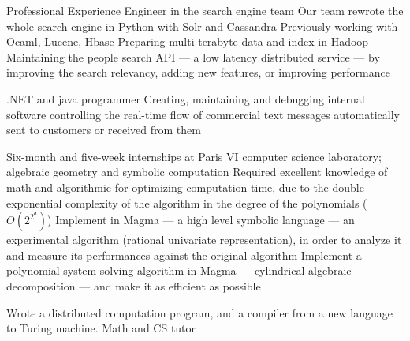 \begin{rubric}{\color{ForestGreen} Professional Experience}
  Engineer in the {search engine team}
 Our team rewrote the whole search engine in Python with Solr and Cassandra
 Previously working with Ocaml, Lucene, Hbase
  Preparing multi-terabyte data and index in Hadoop
  \entry*
  Maintaining the people search API --- a low latency distributed
  service --- by improving the search relevancy, adding new features,
  or improving performance


  .NET and java programmer
  Creating, maintaining and debugging internal software controlling the
  real-time flow of commercial
  text messages automatically sent to customers or received from them


 Six-month and five-week internships at Paris VI computer science laboratory;
 algebraic geometry and symbolic computation
  Required excellent knowledge of math and algorithmic for optimizing
  computation time, due to the double exponential complexity of the
  algorithm in the degree of the polynomials ($O(2^{2^d})$)
  \entry* Implement in Magma --- a high level symbolic language ---
  an experimental
  algorithm (rational univariate representation), in order to analyze it and
  measure its performances against the original algorithm
  \entry* Implement a polynomial system solving algorithm in Magma --- cylindrical algebraic decomposition --- and make it
  as efficient as possible

 Wrote a distributed computation program, and a compiler from a new language to Turing machine.
  Math and CS tutor

\end{rubric}
